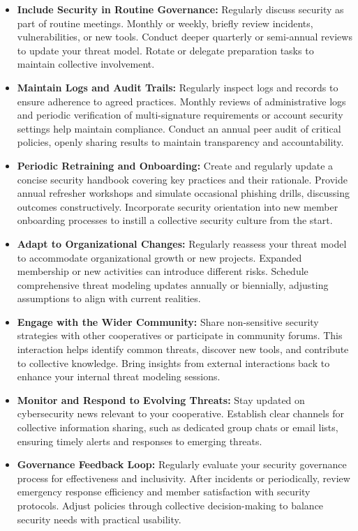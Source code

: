 \begin{itemize}

    \item \textbf{Include Security in Routine Governance:} Regularly discuss
    security as part of routine meetings. Monthly or weekly, briefly review
    incidents, vulnerabilities, or new tools. Conduct deeper quarterly or
    semi-annual reviews to update your threat model. Rotate or delegate preparation
    tasks to maintain collective involvement.
    
    \item \textbf{Maintain Logs and Audit Trails:} Regularly inspect logs and
    records to ensure adherence to agreed practices. Monthly reviews of
    administrative logs and periodic verification of multi-signature requirements or
    account security settings help maintain compliance. Conduct an annual peer audit
    of critical policies, openly sharing results to maintain transparency and
    accountability.
    
    \item \textbf{Periodic Retraining and Onboarding:} Create and regularly update a
    concise security handbook covering key practices and their rationale. Provide
    annual refresher workshops and simulate occasional phishing drills, discussing
    outcomes constructively. Incorporate security orientation into new member
    onboarding processes to instill a collective security culture from the start.
    
    \item \textbf{Adapt to Organizational Changes:} Regularly reassess your threat
    model to accommodate organizational growth or new projects. Expanded membership
    or new activities can introduce different risks. Schedule comprehensive threat
    modeling updates annually or biennially, adjusting assumptions to align with
    current realities.
    
    \item \textbf{Engage with the Wider Community:} Share non-sensitive security
    strategies with other cooperatives or participate in community forums. This
    interaction helps identify common threats, discover new tools, and contribute to
    collective knowledge. Bring insights from external interactions back to enhance
    your internal threat modeling sessions.
    
    \item \textbf{Monitor and Respond to Evolving Threats:} Stay updated on
    cybersecurity news relevant to your cooperative. Establish clear channels for
    collective information sharing, such as dedicated group chats or email lists,
    ensuring timely alerts and responses to emerging threats.
    
    \item \textbf{Governance Feedback Loop:} Regularly evaluate your security
    governance process for effectiveness and inclusivity. After incidents or
    periodically, review emergency response efficiency and member satisfaction with
    security protocols. Adjust policies through collective decision-making to
    balance security needs with practical usability.
    
\end{itemize}

